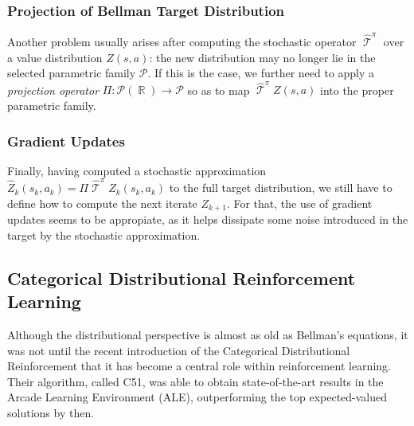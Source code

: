 \documentclass[12pt,a4paper,openright,twoside]{article}
\DeclareMathOperator*{\R}{\mathbb{R}}
\DeclareMathOperator*{\T}{\mathcal{T}}
\numberwithin{equation}{section}
\theoremstyle{definition}
\theoremstyle{remark}
\theoremstyle{plain}
\begin{document}
\subsubsection{Projection of Bellman Target Distribution}
Another problem usually arises after computing the stochastic operator $\widehat{\T}^\pi$ over a value distribution $Z(s,a)$: the new distribution may no longer lie in the selected parametric family $\mathcal{P}$. If this is the case, we further need to apply a \textit{projection operator} $\Pi : \mathscr{P}(\R) \rightarrow \mathcal{P}$ so as to map $\widehat{\T}^\pi Z(s,a)$ into the proper parametric family.

\subsubsection{Gradient Updates}
 Finally, having computed a stochastic approximation $\widehat{Z}_k (s_k,a_k) = \Pi \widehat{\T}^\pi Z_k(s_k,a_k)$ to the full target distribution, we still have to define how to compute the next iterate $Z_{k+1}$. For that, the use of gradient updates seems to be appropiate\cite{rlformulation}, as it helps dissipate some noise introduced in the target by the stochastic approximation.

\subsection{Categorical Distributional Reinforcement Learning}

Although the distributional perspective is almost as old as Bellman's equations\cite{firstDistributional}, it was not until the recent introduction of the Categorical Distributional Reinforcement\cite{DRL} that it has become a central role within reinforcement learning. Their algorithm, called C51, was able to obtain state-of-the-art results in the Arcade Learning Environment\cite{ALE} (ALE), outperforming the top expected-valued solutions by then.
\end{document}

